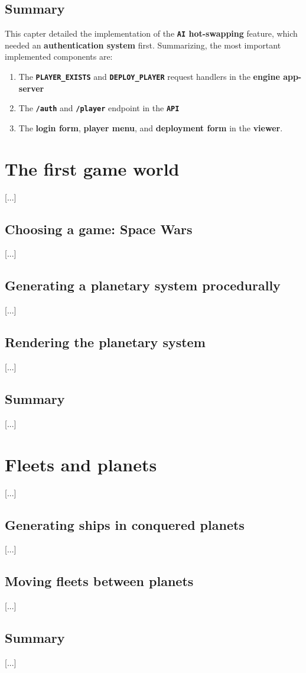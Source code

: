 \documentclass[a4paper,11pt,titlepage,abstract,numbers=noenddot,automark,mnsy,intlimits,rgb,dvipsnames]{report}
\begin{document}
\section{Summary}
This capter detailed the implementation of the \textbf{\texttt{AI} hot-swapping} feature, which needed an
\textbf{authentication system} first. Summarizing, the most important implemented components are:
\begin{enumerate}
\item
The \textbf{\texttt{PLAYER\_EXISTS}} and \textbf{\texttt{DEPLOY\_PLAYER}} request handlers in the \textbf{engine app-server}
\item
The \textbf{\texttt{/auth}} and \textbf{\texttt{/player}} endpoint in the \textbf{\texttt{API}}
\item
The \textbf{login form}, \textbf{player menu}, and \textbf{deployment form} in the \textbf{viewer}.
\end{enumerate}
\chapter{The first game world}
[...]
\section{Choosing a game: Space Wars}
[...]
\section{Generating a planetary system procedurally}
[...]
\section{Rendering the planetary system}
[...]
\section{Summary}
[...]
\chapter{Fleets and planets}
[...]
\section{Generating ships in conquered planets}
[...]
\section{Moving fleets between planets}
[...]
\section{Summary}
[...]
\end{document}
